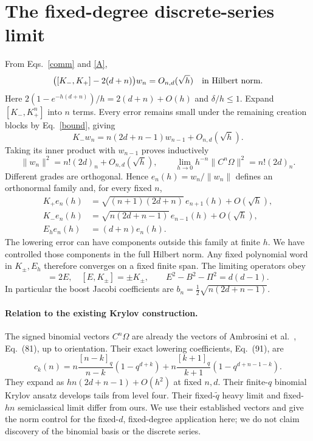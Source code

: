 \documentclass[11pt,a4paper]{article}
\newcommand{\norm}[1]{\lVert#1\rVert}
\begin{document}
\newpage
\section{The fixed-degree discrete-series limit}
From Eqs.~\eqref{comm} and \eqref{A},
\begin{equation}
 \bigl([K_-,K_+]-2(d+n)\bigr)w_n=O_{n,d}(\sqrt h)
 \quad\hbox{in Hilbert norm}.\label{limcomm}
\end{equation}
Here $2(1-e^{-h(d+n)})/h=2(d+n)+O(h)$ and $\delta/h\le1$.
Expand $[K_-,K_+^n]$ into $n$ terms. Every error remains small under
the remaining creation blocks by Eq.~\eqref{bound}, giving
\begin{equation}
 K_-w_n=n(2d+n-1)w_{n-1}+O_{n,d}(\sqrt h).\label{lower}
\end{equation}
Taking its inner product with $w_{n-1}$ proves inductively
\begin{equation}
 \norm{w_n}^2=n!(2d)_n+O_{n,d}(\sqrt h),\qquad
 \lim_{h\to0}h^{-n}\norm{C^n\Omega}^2=n!(2d)_n.\label{norm}
\end{equation}
Different grades are orthogonal. Hence $e_n(h)=w_n/\norm{w_n}$
defines an orthonormal family and, for every fixed $n$,
\begin{align}
 K_+e_n(h)&=\sqrt{(n+1)(2d+n)}\,e_{n+1}(h)+O(\sqrt h),\nonumber\\
 K_-e_n(h)&=\sqrt{n(2d+n-1)}\,e_{n-1}(h)+O(\sqrt h),\label{ladder}\\
 E_he_n(h)&=(d+n)e_n(h).\nonumber
\end{align}
The lowering error can have components outside this family at finite
$h$. We have controlled those components in the full Hilbert norm.
Any fixed polynomial word in $K_\pm,E_h$ therefore converges on a
fixed finite span. The limiting operators obey
\begin{equation}
 [K_-,K_+]=2E,\quad [E,K_\pm]=\pm K_\pm,\qquad
 E^2-B^2-\Pi^2=d(d-1).
\end{equation}
In particular the boost Jacobi coefficients are
$b_n=\tfrac12\sqrt{n(2d+n-1)}$.

\paragraph{Relation to the existing Krylov construction.}
The signed binomial vectors $C^n\Omega$ are already the vectors of
Ambrosini et al.~\cite{ARS}, Eq.~(81), up to orientation. Their exact
lowering coefficients, Eq.~(91), are
\begin{equation}
 c_k(n)=n\frac{[n-k]_q}{n-k}(1-q^{d+k})
       +n\frac{[k+1]_q}{k+1}(1-q^{d+n-1-k}).\label{ck}
\end{equation}
They expand as $hn(2d+n-1)+O(h^2)$ at fixed $n,d$. Their
finite-$q$ binomial Krylov ansatz develops tails from level four.
Their fixed-$\widetilde q$ heavy limit and fixed-$hn$ semiclassical
limit differ from ours. We use their established vectors and give
the norm control for the fixed-$d$, fixed-degree application here;
we do not claim discovery of the binomial basis or the discrete series.
\end{document}
